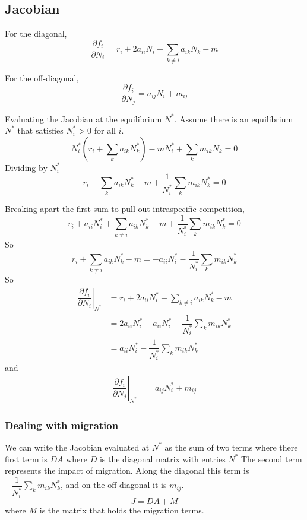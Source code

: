 \documentclass{article}
\begin{document}
\subsection*{Jacobian}
For the diagonal,
\begin{equation}
\dfrac{\partial f_i}{\partial N_i} = r_i + 2a_{ii}N_i + \sum_{k \neq i} a_{ik}N_k - m 
\end{equation}

For the off-diagonal,
\begin{equation}
\dfrac{\partial f_i}{\partial N_j} = a_{ij} N_i + m_{ij}
\end{equation}

Evaluating the Jacobian at the equilibrium $N^*$. Assume there is an equilibrium $N^*$ that satisfies $N^*_i>0$ for all $i$.
\begin{equation}
    N^*_i\left(r_i+\sum_k a_{ik}N^*_k\right)-mN^*_i+\sum_k m_{ik}N_k=0
\end{equation}
Dividing by $N_i^*$
\begin{equation}
r_i+\sum_k a_{ik}N^*_k-m+\dfrac{1}{N^*_i}\sum_k m_{ik}N^*_k=0
\end{equation}

Breaking apart the first sum to pull out intraspecific competition,
\begin{equation}
    r_i+a_{ii}N_i^* + \sum_{k \neq i} a_{ik}N^*_k-m+\dfrac{1}{N^*_i}\sum_k m_{ik}N^*_k=0
\end{equation}
So
\begin{equation}
    r_i+\sum_{k \neq i} a_{ik}N^*_k-m=-a_{ii}N_i^* - \dfrac{1}{N^*_i}\sum_k m_{ik}N^*_k
\end{equation}
So
\begin{align}
    \left.\dfrac{\partial f_i}{\partial N_i} \right \rvert_{N^*} 
    &= r_i + 2a_{ii} N^*_i + \sum_{k\neq i} a_{ik}N^*_k - m \\
    &= 2a_{ii}N^*_i-a_{ii}N_i^* - \dfrac{1}{N^*_i}\sum_k m_{ik}N^*_k \\
    &= a_{ii}N^*_i - \dfrac{1}{N^*_i}\sum_k m_{ik}N^*_k
\end{align}
and
\begin{align}
    \left.\dfrac{\partial f_i}{\partial N_j} \right \rvert_{N^*} 
    &= a_{ij} N^*_i + m_{ij}
\end{align}

\subsubsection*{Dealing with migration}
We can write the Jacobian evaluated at $N^*$ as the sum of two terms where there first term is $D A$ where $D$ is the diagonal matrix with entries $N^*$ The second term represents the impact of migration. Along the diagonal this term is $- \dfrac{1}{N^*_i}\sum_k m_{ik}N^*_k$, and on the off-diagonal it is $m_{ij}$.
\begin{equation}
J = DA + M
\end{equation}
where $M$ is the matrix that holds the migration terms.
\end{document}
